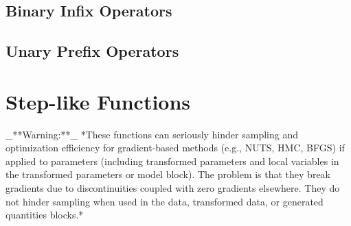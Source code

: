 \begin{description}
{\subsection{Binary Infix Operators}


\begin{description}                \end{description}


\subsection{Unary Prefix Operators}


\begin{description}       \end{description}


\section{Step-like Functions}\label{step-functions.section}


 _**Warning:**_  *These functions can seriously hinder sampling and   optimization efficiency for gradient-based methods (e.g., NUTS, HMC,   BFGS) if applied to parameters (including transformed parameters and   local variables in the transformed parameters or model block).  The   problem is that they break gradients due to discontinuities coupled with   zero gradients elsewhere.  They do not hinder sampling when used in the   data, transformed data, or generated quantities blocks.*


}
\end{description}
